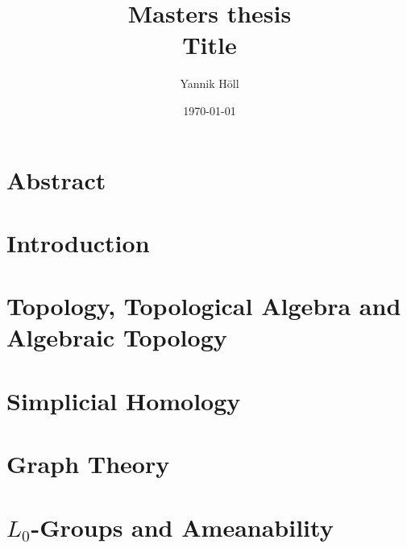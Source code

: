 \documentclass[a4paper, 12pt, twoside]{article}
\title{Masters thesis\\Title}
\author{Yannik Höll}
\date{\today}
\theoremstyle{break}
\theoremstyle{break}
\begin{document}
\begin{titlingpage}
    \maketitle
\end{titlingpage}
\clearpage

\tableofcontents
\pagebreak

\clearpage

\nocite{*}


\section*{Abstract}
\section{Introduction}
\section{Topology, Topological Algebra and Algebraic Topology}
\section{Simplicial Homology}
\section{Graph Theory}
\section{$L_0$-Groups and Ameanability}

\clearpage


\end{document}
